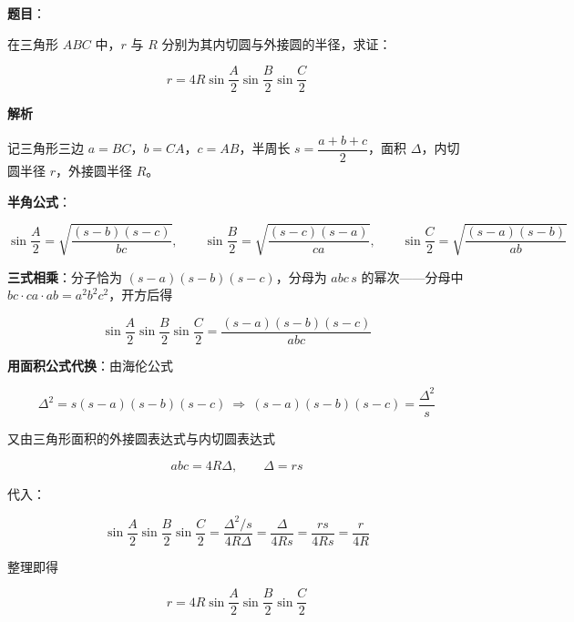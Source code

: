\begin{answer}

\textbf{题目}：

在三角形 $ABC$ 中，$r$ 与 $R$ 分别为其内切圆与外接圆的半径，求证：

\nopagebreak[4]
\[
r=4R\sin\frac A2\sin\frac B2\sin\frac C2
\]

\textbf{解析}

记三角形三边 $a=BC$，$b=CA$，$c=AB$，半周长 $s=\dfrac{a+b+c}2$，面积 $\Delta$，内切圆半径 $r$，外接圆半径 $R$。

\textbf{半角公式}：

\nopagebreak[4]
\[
\sin\frac A2=\sqrt{\frac{(s-b)(s-c)}{bc}},\qquad
\sin\frac B2=\sqrt{\frac{(s-c)(s-a)}{ca}},\qquad
\sin\frac C2=\sqrt{\frac{(s-a)(s-b)}{ab}}
\]

\textbf{三式相乘}：分子恰为 $(s-a)(s-b)(s-c)$，分母为 $abc\,s$ 的幂次——分母中 $bc\cdot ca\cdot ab=a^2b^2c^2$，开方后得

\nopagebreak[4]
\[
\sin\frac A2\sin\frac B2\sin\frac C2=\frac{(s-a)(s-b)(s-c)}{abc}
\]

\textbf{用面积公式代换}：由海伦公式

\nopagebreak[4]
\[
\Delta^2=s(s-a)(s-b)(s-c)\ \Rightarrow\ (s-a)(s-b)(s-c)=\frac{\Delta^2}{s}
\]

又由三角形面积的外接圆表达式与内切圆表达式

\nopagebreak[4]
\[
abc=4R\Delta,\qquad \Delta=rs
\]

代入：

\nopagebreak[4]
\[
\sin\frac A2\sin\frac B2\sin\frac C2=\frac{\Delta^2/s}{4R\Delta}=\frac{\Delta}{4Rs}=\frac{rs}{4Rs}=\frac r{4R}
\]

整理即得

\nopagebreak[4]
\[
r=4R\sin\frac A2\sin\frac B2\sin\frac C2
\]


\end{answer}